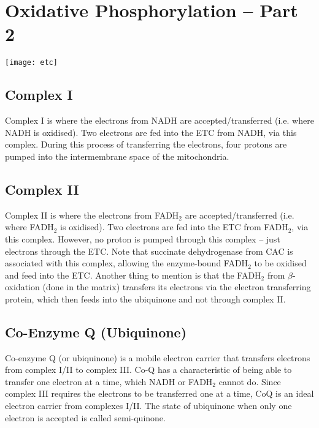 \section{Oxidative Phosphorylation -- Part 2}

\begin{center}
\texttt{[image: etc]}
\end{center}

\subsection{Complex I}

Complex I is where the electrons from NADH are accepted/transferred (i.e. where NADH is oxidised).
Two electrons are fed into the ETC from NADH, via this complex.
During this process of transferring the electrons, four protons are pumped into the intermembrane space of the mitochondria.

\subsection{Complex II}

Complex II is where the electrons from FADH$_2$ are accepted/transferred (i.e. where FADH$_2$ is oxidised).
Two electrons are fed into the ETC from FADH$_2$, via this complex.
However, no proton is pumped through this complex -- just electrons through the ETC.
Note that succinate dehydrogenase from CAC is associated with this complex, allowing the enzyme-bound FADH$_2$ to be oxidised and feed into the ETC.
Another thing to mention is that the FADH$_2$ from $\beta$-oxidation (done in the matrix) transfers its electrons via the electron transferring protein, which then feeds into the ubiquinone and not through complex II.

\subsection{Co-Enzyme Q (Ubiquinone)}

Co-enzyme Q (or ubiquinone) is a mobile electron carrier that transfers electrons from complex I/II to complex III.
Co-Q has a characteristic of being able to transfer one electron at a time, which NADH or FADH$_2$ cannot do.
Since complex III requires the electrons to be transferred one at a time, CoQ is an ideal electron carrier from complexes I/II.
The state of ubiquinone when only one electron is accepted is called semi-quinone.

